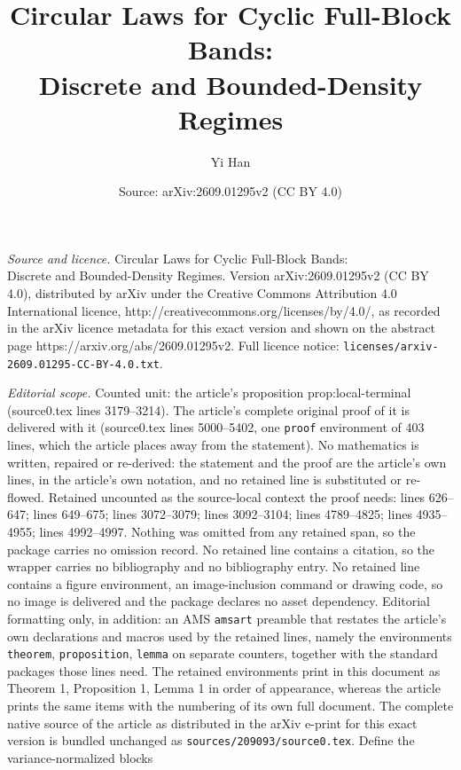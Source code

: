\documentclass[10pt,a4paper]{amsart}
\title{Circular Laws for Cyclic Full-Block Bands:\\ Discrete and Bounded-Density Regimes}
\author{Yi Han}
\date{Source: arXiv:2609.01295v2 (CC BY 4.0)}
\begin{document}
\maketitle

\noindent\emph{Source and licence.} Circular Laws for Cyclic Full-Block Bands:\\ Discrete and Bounded-Density Regimes. Version arXiv:2609.01295v2 (CC BY 4.0), distributed by arXiv under the Creative Commons Attribution 4.0 International licence, http://creativecommons.org/licenses/by/4.0/, as recorded in the arXiv licence metadata for this exact version and shown on the abstract page https://arxiv.org/abs/2609.01295v2. Full licence notice: \texttt{licenses/arxiv-2609.01295-CC-BY-4.0.txt}.\par\smallskip

\noindent\textit{Editorial scope.} Counted unit: the article's proposition prop:local-terminal (source0.tex lines 3179--3214). The article's complete original proof of it is delivered with it (source0.tex lines 5000--5402, one \texttt{proof} environment of 403 lines, which the article places away from the statement). No mathematics is written, repaired or re-derived: the statement and the proof are the article's own lines, in the article's own notation, and no retained line is substituted or re-flowed.  Retained uncounted as the source-local context the proof needs: lines 626--647; lines 649--675; lines 3072--3079; lines 3092--3104; lines 4789--4825; lines 4935--4955; lines 4992--4997.  Nothing was omitted from any retained span, so the package carries no omission record.  No retained line contains a citation, so the wrapper carries no bibliography and no bibliography entry.  No retained line contains a figure environment, an image-inclusion command or drawing code, so no image is delivered and the package declares no asset dependency.  Editorial formatting only, in addition: an AMS \texttt{amsart} preamble that restates the article's own declarations and macros used by the retained lines, namely the environments \texttt{theorem}, \texttt{proposition}, \texttt{lemma} on separate counters, together with the standard packages those lines need.  The retained environments print in this document as Theorem 1, Proposition 1, Lemma 1 in order of appearance, whereas the article prints the same items with the numbering of its own full document.  The complete native source of the article as distributed in the arXiv e-print for this exact version is bundled unchanged as \texttt{sources/209093/source0.tex}.
Define the variance-normalized blocks
\end{document}
